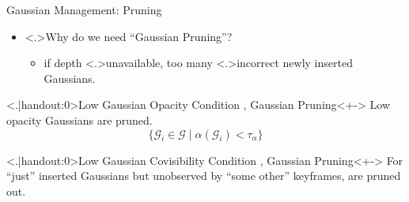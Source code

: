 \begin{Frame}{Gaussian Management: Pruning}
	\begin{itemize}
		\setlength{\itemsep}{1.5ex}
		\item<+-> \alert<.>{Why} do we need ``Gaussian Pruning''?
			\vspace*{1.5ex}
			\begin{itemize}
				\setlength{\itemsep}{1.5ex}
				\item<+-> if depth \alert<.>{unavailable}, too many \alert<.>{incorrect} newly inserted Gaussians.
			\end{itemize}
	\end{itemize}
	\vspace*{\fill}
	\begin{block}{\alert<.|handout:0>{Low Gaussian Opacity} \hfill Condition , Gaussian Pruning}<+->
		Low opacity Gaussians are pruned.
		\begin{equation}
			\{\mathcal{G}_i \in \mathcal{G}\;\vert\;\alpha(\mathcal{G}_i) < \tau_{\alpha} \}
		\end{equation}
	\end{block}
	\vspace*{\fill}
	\begin{block}{\alert<.|handout:0>{Low Gaussian Covisibility} \hfill Condition , Gaussian Pruning}<+->
		For ``just'' inserted Gaussians but unobserved by ``some other'' keyframes, are pruned out.
	\end{block}
\end{Frame}

